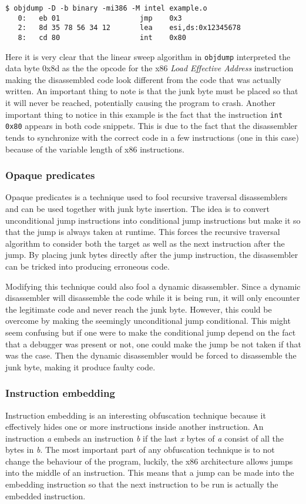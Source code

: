 \documentclass[11pt,twoside]{eitExjobb}
\begin{document}
\begin{verbatim}
$ objdump -D -b binary -mi386 -M intel example.o
   0:	eb 01                	jmp    0x3
   2:	8d 35 78 56 34 12    	lea    esi,ds:0x12345678
   8:	cd 80                	int    0x80
\end{verbatim}

\noindent Here it is very clear that the linear sweep algorithm in \texttt{objdump} interpreted the data byte 0x8d as the the opcode for the x86 \emph{Load Effective Address} instruction making the disassembled code look different from the code that was actually written. An important thing to note is that the junk byte must be placed so that it will never be reached, potentially causing the program to crash. Another important thing to notice in this example is the fact that the instruction \texttt{int 0x80} appears in both code snippets. This is due to the fact that the disassembler tends to synchronize with the correct code in a few instructions (one in this case) because of the variable length of x86 instructions.  

\subsubsection{Opaque predicates}
Opaque predicates is a technique used to fool recursive traversal disassemblers and can be used together with junk byte insertion. The idea is to convert unconditional jump instructions into conditional jump instructions but make it so that the jump is always taken at runtime. This forces the recursive traversal algorithm to consider both the target as well as the next instruction after the jump. By placing junk bytes directly after the jump instruction, the disassembler can be tricked into producing erroneous code.\cite{instructionoverlapping}

Modifying this technique could also fool a dynamic disassembler. Since a dynamic disassembler will disassemble the code while it is being run, it will only encounter the legitimate code and never reach the junk byte. However, this could be overcome by making the seemingly unconditional jump conditional. This might seem confusing but if one were to make the conditional jump depend on the fact that a debugger was present or not, one could make the jump be not taken if that was the case. Then the dynamic disassembler would be forced to disassemble the junk byte, making it produce faulty code.


\subsubsection{Instruction embedding}
Instruction embedding\cite{instructionembedding} is an interesting obfuscation technique because it effectively hides one or more instructions inside another instruction. An instruction \emph{a} embeds an instruction \emph{b} if the last \emph{x} bytes of \emph{a} consist of all the bytes in \emph{b}. The most important part of any obfuscation technique is to not change the behaviour of the program, luckily, the x86 architecture allows jumps into the middle of an instruction. This means that a jump can be made into the embedding instruction so that the next instruction to be run is actually the embedded instruction.
\end{document}
